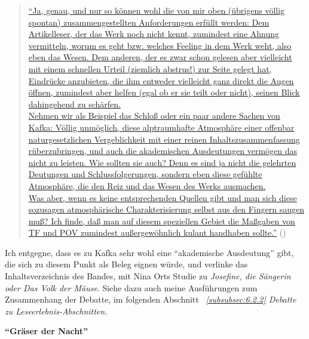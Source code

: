 \documentclass[fontsize=12pt]{scrartcl}
\begin{document}
\singlespacing
\begin{quote}
\href{https://de.wikipedia.org/w/index.php?title=Benutzer_Diskussion:Grillenwaage\&diff=137961506\&oldid=137943802}{"`Ja, genau, und nur so k\"onnen wohl die von mir oben (\"ubrigens v\"ollig spontan) zusammengestellten \flq Anforderungen\frq \,\,erf\"ullt werden: Dem Artikelleser, der das Werk noch nicht kennt, zumindest eine Ahnung vermitteln, \flq worum es geht\frq \,\,bzw. welches \flq Feeling\frq \,\,in dem Werk weht, also eben das \flq Wesen\frq. Dem anderen, der es zwar schon gelesen aber viel\-leicht mit einem schnellen Urteil (\flq ziemlich abstrus!\frq ) zur Seite gelegt hat, Eindr\"ucke anzubieten, die ihm entweder vielleicht ganz direkt die Augen \"offnen, zumindest aber helfen (egal ob er sie teilt oder nicht), seinen Blick dahingehend zu sch\"arfen.\\
Nehmen wir als Beispiel das Schlo{\ss} oder ein paar andere Sachen von Kafka: V\"ollig unm\"oglich, diese alptraumhafte Atmosph\"are einer offenbar naturgesetzlichen Vergeblichkeit mit einer reinen Inhaltszusammenfassung r\"uberzubringen, und auch die akademischen Ausdeutungen ver\-m\"o\-gen das nicht zu leisten. Wie sollten sie auch? Denn es sind ja nicht die gelehrten Deutungen und Schlussfolgerungen, sondern eben diese gef\"uhlte Atmosph\"are, die den Reiz und das Wesen des Werks ausmachen.\\
Was aber, wenn es keine entsprechenden Quellen gibt und man sich diese sozusagen \flq atmosph\"arische\frq \,\,Charakterisierung \mbox{selbst} aus den Fingern saugen mu{\ss}? Ich finde, da{\ss} man auf diesem speziellen Gebiet die Ma{\ss}gaben von TF und POV zumindest au{\ss}ergew\"ohnlich kulant handhaben sollte."'} (\cite{UserEpipactis2015b})
\end{quote}
\onehalfspacing

Ich entgegne, dass es zu Kafka sehr wohl eine "`akademische Ausdeutung"' gibt, die sich zu diesem Punkt als Beleg eignen w\"urde, und verlinke das Inhaltsverzeichnis des Bandes, mit Nina Orts Studie zu \textit{Josefine, die S\"angerin oder Das Volk der M\"ause}. Siehe dazu auch meine Ausf\"uh\-rungen zum Zusammenhang der Debatte, im folgenden Abschnitt \textit{~\ref{subsubsec:6.2.2} Debatte zu Leseerlebnis-Abschnitten}.\newline

\textbf{"`Gr\"aser der Nacht"'}
\end{document}
